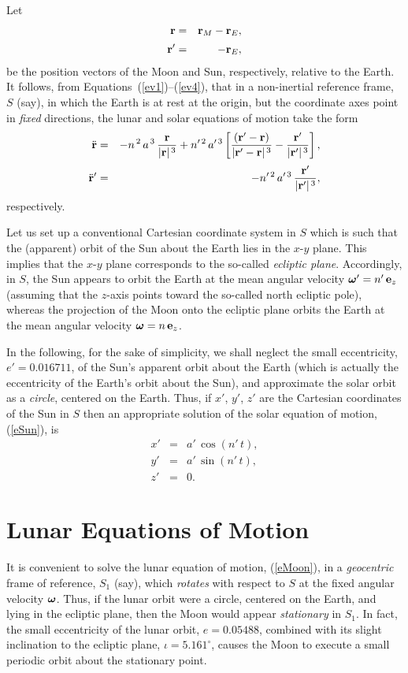 Let 
\begin{eqnarray}
{\bf r}&=&{\bf r}_M-{\bf r}_E,\\[0.5ex]
{\bf r}' &=& -{\bf r}_E,\label{ev4}
\end{eqnarray}
be the position
vectors of the Moon and Sun, respectively, relative to the Earth. It follows, from Equations~(\ref{ev1})--(\ref{ev4}), that in a non-inertial
 reference frame,   $S$ (say), in which the Earth is at rest at the origin, but the coordinate axes point
 in {\em fixed}\/ directions, the
lunar and solar equations of motion take the form
 \begin{eqnarray}\label{eMoon}
 \ddot{\bf r} &=&
 - n^{\,2}\,a^{\,3}\,\frac{{\bf r}}{|{\bf r}|^{\,3}}
  + n'^{\,2}\,a'^{\,3}
 \left[\frac{({\bf r}'-{\bf r})}{|{\bf r}'-{\bf r}|^{\,3}}-\frac{{\bf r}'}{|{\bf r}'|^{\,3}}\right],
\\[0.5ex]
\ddot{\bf r}' &=& - n'^{\,2}\,a'^{\,3}\,\frac{{\bf r}'}{|{\bf r}'|^{\,3}},\label{eSun}
\end{eqnarray}
 respectively.  
 
 Let us set up a conventional Cartesian coordinate system in $S$ 
 which is  such that the (apparent)  orbit of the
 Sun about the Earth lies in the $x$-$y$ plane. This implies that the
 $x$-$y$ plane corresponds to the so-called {\em ecliptic plane}. Accordingly, in $S$, the Sun
 appears to orbit the Earth at the mean angular velocity $\mbox{\boldmath$\omega$}'=n'\,{\bf e}_z$ (assuming that the $z$-axis points
 toward the so-called north ecliptic pole), whereas the
  projection of the Moon onto the ecliptic plane  orbits the Earth at the mean angular velocity $\mbox{\boldmath$\omega$} = n\,{\bf e}_z$.

In the following, for the sake of simplicity, we shall neglect the small eccentricity, 
 $e'=0.016711$, of the Sun's apparent orbit about the
Earth (which is actually the eccentricity of the Earth's orbit about the Sun), and approximate the solar orbit as a {\em circle}, centered on the Earth. Thus, if $x'$, $y'$, $z'$ are the Cartesian coordinates of the Sun in $S$ then
 an appropriate solution of the solar equation of motion, (\ref{eSun}), is
 \begin{eqnarray}\label{evx}
 x'&=&a'\,\cos(n'\,t),\\[0.5ex]
 y'&=&a'\,\sin(n'\,t),\\[0.5ex]
 z' &=&0.\label{evz}
 \end{eqnarray}
 
 \section{Lunar Equations of Motion}
  It is convenient to solve the lunar equation of motion, (\ref{eMoon}), in a {\em geocentric}\/ frame of reference, $S_1$ (say), which {\em rotates}\/ with respect to
 $S$ at the fixed angular velocity $\mbox{\boldmath$\omega$}$. Thus, if the lunar orbit  were a circle, centered on the Earth, and lying in the ecliptic plane,
 then the Moon would appear {\em stationary}\/ in $S_1$. In fact, the small eccentricity of the lunar orbit, $e=0.05488$, combined
 with its slight inclination to the ecliptic plane, $\iota=5.161^\circ$, causes the Moon to execute a small periodic orbit about the stationary point. 
 
